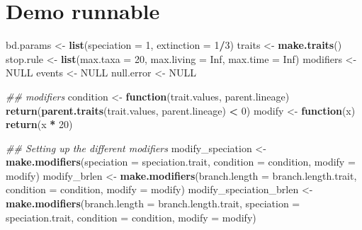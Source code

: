 \documentclass[]{book}
\newenvironment{Shaded}{\begin{snugshade}}{\end{snugshade}}
\newcommand{\CommentTok}[1]{\textcolor[rgb]{0.56,0.35,0.01}{\textit{#1}}}
\newcommand{\ControlFlowTok}[1]{\textcolor[rgb]{0.13,0.29,0.53}{\textbf{#1}}}
\newcommand{\DataTypeTok}[1]{\textcolor[rgb]{0.13,0.29,0.53}{#1}}
\newcommand{\DecValTok}[1]{\textcolor[rgb]{0.00,0.00,0.81}{#1}}
\newcommand{\KeywordTok}[1]{\textcolor[rgb]{0.13,0.29,0.53}{\textbf{#1}}}
\newcommand{\NormalTok}[1]{#1}
\newcommand{\OperatorTok}[1]{\textcolor[rgb]{0.81,0.36,0.00}{\textbf{#1}}}
\newcommand{\OtherTok}[1]{\textcolor[rgb]{0.56,0.35,0.01}{#1}}
\newcommand{\StringTok}[1]{\textcolor[rgb]{0.31,0.60,0.02}{#1}}
\begin{document}
\hypertarget{demo-runnable}{%
\section{Demo runnable}\label{demo-runnable}}

\begin{Shaded}
\begin{Highlighting}[]
\NormalTok{bd.params <-}\StringTok{ }\KeywordTok{list}\NormalTok{(}\DataTypeTok{speciation =} \DecValTok{1}\NormalTok{, }\DataTypeTok{extinction =} \DecValTok{1}\OperatorTok{/}\DecValTok{3}\NormalTok{)}
\NormalTok{traits <-}\StringTok{ }\KeywordTok{make.traits}\NormalTok{()}
\NormalTok{stop.rule <-}\StringTok{ }\KeywordTok{list}\NormalTok{(}\DataTypeTok{max.taxa =} \DecValTok{20}\NormalTok{, }\DataTypeTok{max.living =} \OtherTok{Inf}\NormalTok{, }\DataTypeTok{max.time =} \OtherTok{Inf}\NormalTok{)}
\NormalTok{modifiers <-}\StringTok{ }\OtherTok{NULL}
\NormalTok{events <-}\StringTok{ }\OtherTok{NULL}
\NormalTok{null.error <-}\StringTok{ }\OtherTok{NULL}

\CommentTok{## modifiers}
\NormalTok{condition <-}\StringTok{ }\ControlFlowTok{function}\NormalTok{(trait.values, parent.lineage) }\KeywordTok{return}\NormalTok{(}\KeywordTok{parent.traits}\NormalTok{(trait.values, parent.lineage) }\OperatorTok{<}\StringTok{ }\DecValTok{0}\NormalTok{)}
\NormalTok{modify <-}\StringTok{ }\ControlFlowTok{function}\NormalTok{(x) }\KeywordTok{return}\NormalTok{(x }\OperatorTok{*}\StringTok{ }\DecValTok{20}\NormalTok{)}

\CommentTok{## Setting up the different modifiers}
\NormalTok{modify_speciation <-}\StringTok{ }\KeywordTok{make.modifiers}\NormalTok{(}\DataTypeTok{speciation    =}\NormalTok{ speciation.trait,}
                                    \DataTypeTok{condition     =}\NormalTok{ condition,}
                                    \DataTypeTok{modify        =}\NormalTok{ modify)}
\NormalTok{modify_brlen <-}\StringTok{ }\KeywordTok{make.modifiers}\NormalTok{(}\DataTypeTok{branch.length =}\NormalTok{ branch.length.trait,}
                               \DataTypeTok{condition     =}\NormalTok{ condition,}
                               \DataTypeTok{modify        =}\NormalTok{ modify)}
\NormalTok{modify_speciation_brlen <-}\StringTok{ }\KeywordTok{make.modifiers}\NormalTok{(}\DataTypeTok{branch.length =}\NormalTok{ branch.length.trait,}
                                          \DataTypeTok{speciation    =}\NormalTok{ speciation.trait,}
                                          \DataTypeTok{condition     =}\NormalTok{ condition,}
                                          \DataTypeTok{modify        =}\NormalTok{ modify)}


\end{Highlighting}
\end{Shaded}
\end{document}
